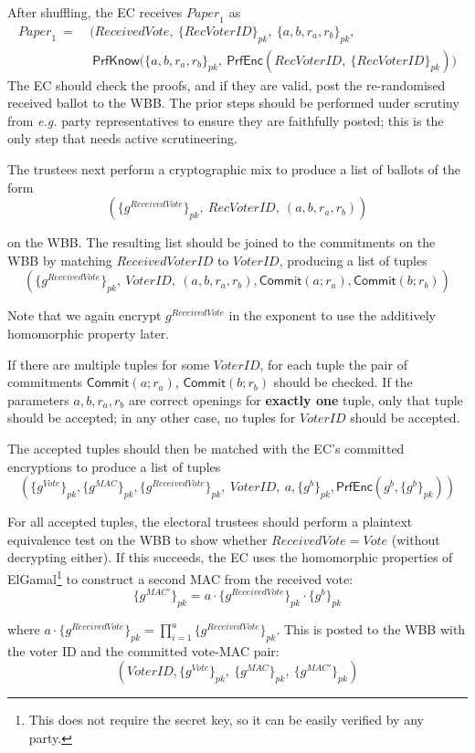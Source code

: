 \documentclass[12pt,a4paper]{article}
\newcommand{\commit}{\mathsf{Commit}}
\newcommand{\PrfEnc}{\mathsf{PrfEnc}}
\newcommand{\PrfKnow}{\mathsf{PrfKnow}}
\theoremstyle{definition}
\newcommand{\Vote}{\mathit{Vote}}
\newcommand{\VoterID}{\mathit{VoterID}}
\newcommand{\receivedvid}{\mathit{RecVoterID}}
\newcommand{\Paper}{\mathit{Paper}}
\newcommand{\Mac}{\mathit{MAC}}
\newcommand{\eg}{\textit{e.g. }}
\begin{document}
After shuffling, the EC receives $\Paper_1$ as
\begin{align*}
    \Paper_1\ =\ &\big(ReceivedVote,\ \{\receivedvid\}_{pk},\ \{a,b,r_a,r_b\}_{pk},\\
             &\ \PrfKnow(\{a,b,r_a,r_b\}_{pk},\ \mathsf{PrfEnc}(\receivedvid,\ \{\receivedvid\}_{pk})\big)
\end{align*}
The EC should check the proofs, and if they are valid, post the re-randomised received ballot to the WBB. The prior steps should be performed under scrutiny from \eg party representatives to ensure they are faithfully posted; this is the only step that needs active scrutineering.

The trustees next perform a cryptographic mix to produce a list of ballots of the form
$$\left(\{g^{ReceivedVote}\}_{pk},\ \receivedvid,\ (a,b,r_a,r_b)\right)$$

on the WBB. The resulting list should be joined to the commitments on the WBB by matching $ReceivedVoterID$ to $\VoterID$, producing a list of tuples
$$\left(\{g^{ReceivedVote}\}_{pk},\ \VoterID,\ (a,b,r_a,r_b), \commit(a;r_a), \commit(b;r_b)\right)$$

Note that we again encrypt $g^{ReceivedVote}$ in the exponent to use the additively homomorphic property later.

If there are multiple tuples for some $\VoterID$, for each tuple the pair of commitments $\commit(a;r_a)$, $\commit(b;r_b)$ should be checked. If the parameters $a,b,r_a,r_b$ are correct openings for \textbf{exactly one} tuple, only that tuple should be accepted; in any other case, no tuples for $\VoterID$ should be accepted.

The accepted tuples should then be matched with the EC's committed encryptions to produce a list of tuples
$$\left(\{g^{\Vote}\}_{pk},\{g^\Mac\}_{pk}, \{g^{ReceivedVote}\}_{pk},\ \VoterID,\ a, \{g^b\}_{pk}, \PrfEnc(g^b, \{g^b\}_{pk})\right)$$

For all accepted tuples, the electoral trustees should perform a plaintext equivalence test on the WBB to show whether $ReceivedVote=\Vote$ (without decrypting either). If this succeeds, the EC uses the homomorphic properties of ElGamal\footnote{This does not require the secret key, so it can be easily verified by any party.} to construct a second MAC from the received vote:
$$\{g^{\Mac'}\}_{pk}=a\cdot\{g^{ReceivedVote}\}_{pk}\cdot\{g^{b}\}_{pk}$$

where $a\cdot\{g^{ReceivedVote}\}_{pk} = \prod_{i=1}^a \{g^{ReceivedVote}\}_{pk}$. This is posted to the WBB with the voter ID and the committed vote-MAC pair:
$$\left(\VoterID, \{g^{\Vote}\}_{pk},\ \{g^\Mac\}_{pk},\ \{g^{\Mac'}\}_{pk}\right)$$
\end{document}
